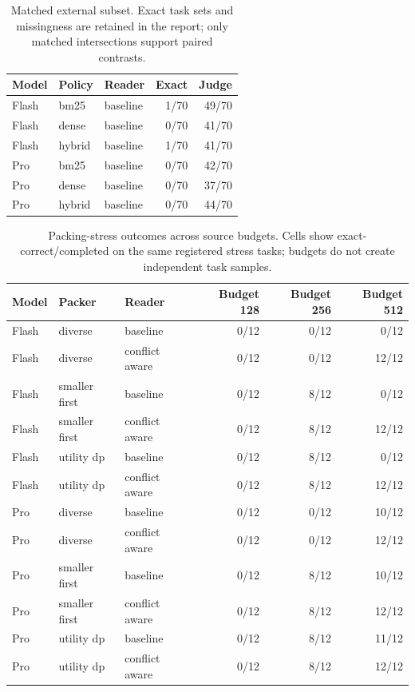 \documentclass{article}
\begin{document}
\begin{table}[ht]\centering\footnotesize\begin{tabular}{lllrr}\toprule
Model & Policy & Reader & Exact & Judge \\ \midrule
Flash & bm25 & baseline & 1/70 & 49/70 \\
Flash & dense & baseline & 0/70 & 41/70 \\
Flash & hybrid & baseline & 1/70 & 41/70 \\
Pro & bm25 & baseline & 0/70 & 42/70 \\
Pro & dense & baseline & 0/70 & 37/70 \\
Pro & hybrid & baseline & 0/70 & 44/70 \\
\bottomrule\end{tabular}\caption{Matched external subset. Exact task sets and missingness are retained in the report; only matched intersections support paired contrasts.}\end{table}
\begin{table}[ht]\centering\footnotesize\begin{tabular}{lllrrr}\toprule
Model & Packer & Reader & Budget 128 & Budget 256 & Budget 512 \\ \midrule
Flash & diverse & baseline & 0/12 & 0/12 & 0/12 \\
Flash & diverse & conflict aware & 0/12 & 0/12 & 12/12 \\
Flash & smaller first & baseline & 0/12 & 8/12 & 0/12 \\
Flash & smaller first & conflict aware & 0/12 & 8/12 & 12/12 \\
Flash & utility dp & baseline & 0/12 & 8/12 & 0/12 \\
Flash & utility dp & conflict aware & 0/12 & 8/12 & 12/12 \\
Pro & diverse & baseline & 0/12 & 0/12 & 10/12 \\
Pro & diverse & conflict aware & 0/12 & 0/12 & 12/12 \\
Pro & smaller first & baseline & 0/12 & 8/12 & 10/12 \\
Pro & smaller first & conflict aware & 0/12 & 8/12 & 12/12 \\
Pro & utility dp & baseline & 0/12 & 8/12 & 11/12 \\
Pro & utility dp & conflict aware & 0/12 & 8/12 & 12/12 \\
\bottomrule\end{tabular}\caption{Packing-stress outcomes across source budgets. Cells show exact-correct/completed on the same registered stress tasks; budgets do not create independent task samples.}\end{table}
\end{document}
